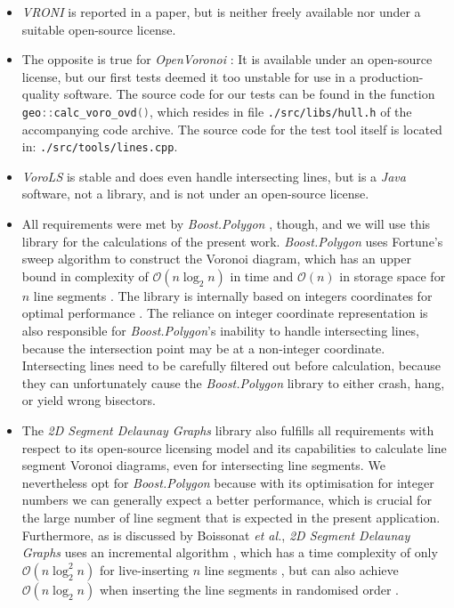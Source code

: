 \begin{itemize}
	\item \textit{VRONI} \cite{Held2001} is reported in a paper, but is neither freely available 
		nor under a suitable open-source license.
	\item The opposite is true for \textit{OpenVoronoi} \cite{web_openvoronoi}: 
		It is available under an open-source license, but our first tests deemed it too unstable 
		for use in a production-quality software. 
		The source code for our tests can be found in the function \lstinline[language=C++]|geo::calc_voro_ovd()|, 
		which resides in file \lstinline|./src/libs/hull.h| of the accompanying code archive. 
		The source code for the test tool itself is located in: \lstinline|./src/tools/lines.cpp|.
	\item \textit{VoroLS} \cite{DiplomaSchumann} is stable and does even handle intersecting lines, but is a \textit{Java}
		software, not a library, and is not under an open-source license.
	\item All requirements were met by \textit{Boost.Polygon} \cite{web_boost_polygon}, though, and we will use 
		this library for the calculations of the present work.
		\textit{Boost.Polygon}  uses Fortune's sweep algorithm \cite{Fortune1987} to construct 
		the Voronoi diagram, which has an upper bound in complexity of $\mathcal{O}\left( n \log_2 n \right)$ in time
		and $\mathcal{O}\left( n \right)$ in storage space for $n$ line segments \cite[p. 168]{Fortune1987}.
		The library is internally based on integers coordinates for optimal performance \cite{web_boost_polygon}.
		The reliance on integer coordinate representation is also responsible for \textit{Boost.Polygon}'s 
		inability to handle intersecting lines, because the intersection point may be at a non-integer coordinate. 
		Intersecting lines need to be carefully filtered out before calculation, because they can unfortunately cause the 
		\textit{Boost.Polygon} library to either crash, hang, or yield wrong bisectors.
	\item The \textit{2D Segment Delaunay Graphs} library \cite{web_2dsegdel} also fulfills all requirements with respect
		to its open-source licensing model and its capabilities to calculate line segment Voronoi diagrams, even for 
		intersecting line segments. We nevertheless opt for \textit{Boost.Polygon} because with its optimisation
		for integer numbers we can generally expect a better performance, which is crucial for the large number of
		line segment that is expected in the present application.
		Furthermore, as is discussed by Boissonat \textit{et al.}, \textit{2D Segment Delaunay Graphs} uses an incremental 
		algorithm \cite[pp. 114-115]{Boissonnat2006}, which has a time complexity of only
		$\mathcal{O}\left( n \log_2^2 n \right)$ for live-inserting $n$ line segments \cite[p. 104]{Boissonnat2006}, 
		but can also achieve $\mathcal{O}\left( n \log_2 n \right)$ when inserting the line segments in randomised 
		order \cite[p. 105]{Boissonnat2006}.
\end{itemize}




